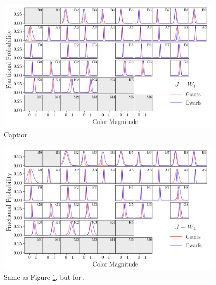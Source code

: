 \begin{figure}
    \centering
    \includegraphics[width=1.0\textwidth,clip=true]{Figures/periodic/periodic-t-pdf_J_W1.png}
    \caption{Caption}
    \label{fig:periodic-pdf-jw1}
\end{figure}

\begin{figure}
    \centering
    \includegraphics[width=1.0\textwidth,clip=true]{Figures/periodic/periodic-t-pdf_J_W2.png}
    \caption{Same as Figure \ref{fig:periodic-pdf-jw1}, but for \jwtwo.}
    \label{fig:periodic-pdf-jw2}
\end{figure}


